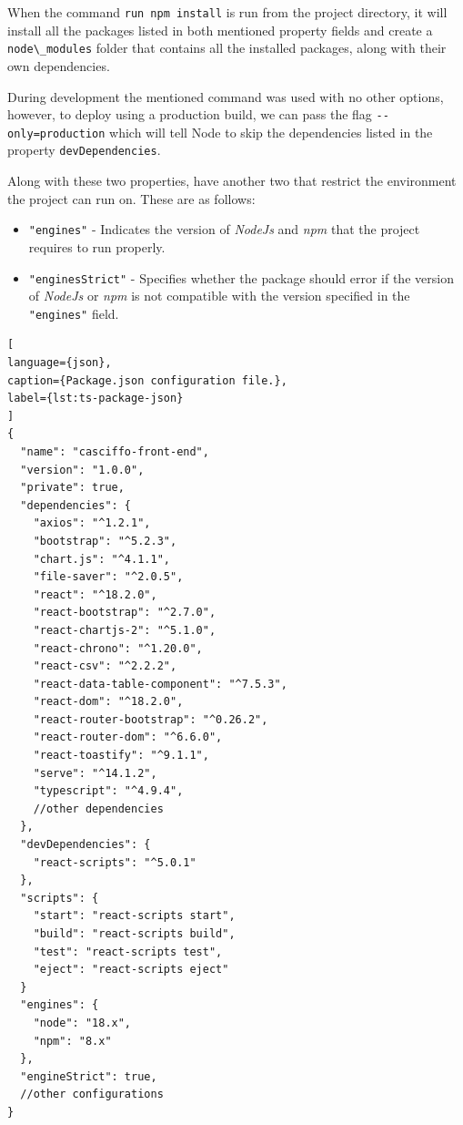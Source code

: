 When the command \lstinline{run npm install} is run from the project directory, it will install all the packages listed in both mentioned property fields and create a \lstinline{node\_modules} folder that contains all the installed packages, along with their own dependencies.

During development the mentioned command was used with no other options, however, to deploy using a production build, we can pass the flag \lstinline{--only=production} which will tell Node to skip the dependencies listed in the property \lstinline{devDependencies}.

Along with these two properties, have another two that restrict the environment the project can run on. These are as follows:
\begin{itemize}
    \item \lstinline{"engines"} - Indicates the version of \textit{NodeJs} and \textit{npm} that the project requires to run properly.
    \item \lstinline{"enginesStrict"} - Specifies whether the package should error if the version of \textit{NodeJs} or \textit{npm} is not compatible with the version specified in the \lstinline{"engines"} field. 
\end{itemize}

\begin{lstlisting}[
language={json},
caption={Package.json configuration file.},
label={lst:ts-package-json}
]
{
  "name": "casciffo-front-end",
  "version": "1.0.0",
  "private": true,
  "dependencies": {
    "axios": "^1.2.1",
    "bootstrap": "^5.2.3",
    "chart.js": "^4.1.1",
    "file-saver": "^2.0.5",
    "react": "^18.2.0",
    "react-bootstrap": "^2.7.0",
    "react-chartjs-2": "^5.1.0",
    "react-chrono": "^1.20.0",
    "react-csv": "^2.2.2",
    "react-data-table-component": "^7.5.3",
    "react-dom": "^18.2.0",
    "react-router-bootstrap": "^0.26.2",
    "react-router-dom": "^6.6.0",
    "react-toastify": "^9.1.1",
    "serve": "^14.1.2",
    "typescript": "^4.9.4",
    //other dependencies
  },
  "devDependencies": {
    "react-scripts": "^5.0.1"
  },
  "scripts": {
    "start": "react-scripts start",
    "build": "react-scripts build",
    "test": "react-scripts test",
    "eject": "react-scripts eject"
  }
  "engines": {
    "node": "18.x",
    "npm": "8.x"
  },
  "engineStrict": true,
  //other configurations
}
\end{lstlisting}



